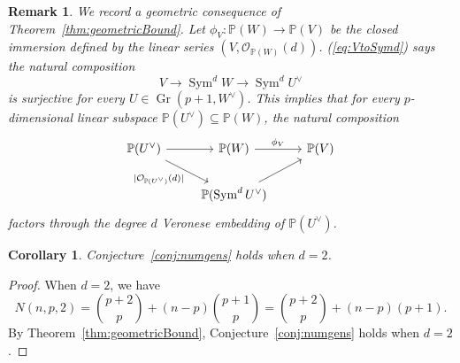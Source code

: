 \documentclass[11pt,letterpaper,reqno]{amsart}
\newcommand{\Gr}{\operatorname{Gr}}
\newcommand{\Sym}{\operatorname{Sym}}
\newcommand{\mc}[1]{\mathcal{#1}}
\def\PP{{\mathbb P}}
\def\lra{\longrightarrow}
\newtheorem{corollary}[theorem]{Corollary}
\newtheorem{remark}[theorem]{Remark}
\theoremstyle{definition}
\numberwithin{equation}{section}
\begin{document}
\begin{remark}\label{rmk:linearspacemapVeronese}
    We record a geometric consequence of Theorem~\ref{thm:geometricBound}. Let $\phi_V \colon \PP(W) \lra \PP(V)$ be the closed immersion defined by the linear series $(V,\mc{O}_{\PP(W)}(d))$. (\ref{eq:VtoSymd}) says the natural composition
    \[V \lra \Sym^d W \lra \Sym^d U^\vee\]
    is surjective for every $U \in \Gr(p+1,W^\vee)$. This implies that for every $p$-dimensional linear subspace $\PP(U^\vee) \subseteq \PP(W)$, the natural composition
    \[\begin{tikzcd}
    \PP(U^\vee) \arrow[r] \arrow[rd, "|\mc{O}_{\PP(U^\vee)}(d)|"'] & \PP(W) \arrow[r, "\phi_V"] & \PP(V) \\
                                                         & \PP(\Sym^d U^\vee) \arrow[ru]   &       
    \end{tikzcd}\]
    factors through the degree $d$ Veronese embedding of $\PP(U^\vee)$.
\end{remark}

\begin{corollary}\label{cor:numgend2}
    Conjecture~\ref{conj:numgens} holds when $d = 2$.
\end{corollary}
\begin{proof}
    When $d = 2$, we have
    \[N(n,p,2) = \binom{p+2}{p} + (n-p)\binom{p+1}{p} = \binom{p+2}{p} + (n-p)(p+1).\]
    By Theorem~\ref{thm:geometricBound}, Conjecture~\ref{conj:numgens} holds when $d = 2$.
\end{proof}
\end{document}

